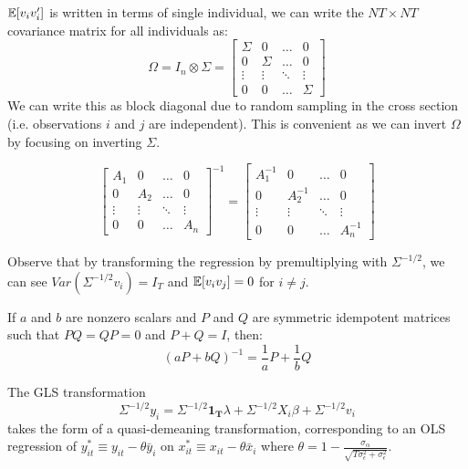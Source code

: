 \documentclass[DIV=14,titlepage=false]{scrreprt}
\begin{document}
$\mathbb{E}[v_{i}v_{i}']$ is written in terms of single individual, we can write the $NT \times NT$ covariance matrix for all individuals as:
\[
    \Omega = I_n \otimes \Sigma = \begin{bmatrix}
        \Sigma & 0 & \ldots & 0 \\
        0 & \Sigma & \ldots & 0 \\
        \vdots & \vdots & \ddots & \vdots \\
        0 & 0 & \ldots & \Sigma
    \end{bmatrix}
\]
We can write this as block diagonal due to random sampling in the cross section (i.e. observations $i$ and $j$ are independent). This is convenient as we can invert $\Omega$ by focusing on inverting $\Sigma$.
\begin{lemma}
    \[
        \begin{bmatrix}
            A_1 & 0 & \ldots & 0 \\
            0 & A_2 & \ldots & 0 \\
            \vdots & \vdots & \ddots & \vdots \\
            0 & 0 & \ldots & A_n
        \end{bmatrix}^{-1} = \begin{bmatrix}
            A_1^{-1} & 0 & \ldots & 0 \\
            0 & A_2^{-1} & \ldots & 0 \\
            \vdots & \vdots & \ddots & \vdots \\
            0 & 0 & \ldots & A_n^{-1}
        \end{bmatrix}
    \]
\end{lemma}
Observe that by transforming the regression by premultiplying with $\Sigma^{-1/2}$, we can see $Var(\Sigma^{-1/2}v_i) = I_T$ and $\mathbb{E}[v_i v_j] = 0$ for $i \neq j$.
\begin{lemma}
    If $a$ and $b$ are nonzero scalars and $P$ and $Q$ are symmetric idempotent matrices such that $PQ = QP = 0$ and $P + Q = I$, then:
    \[
        (aP + bQ)^{-1} = \frac{1}{a}P + \frac{1}{b}Q
    \]
\end{lemma}
\begin{theorem}
    The GLS transformation
    \[
        \Sigma^{-1/2}y_i = \Sigma^{-1/2}\mathbf{1_T}\lambda + \Sigma^{-1/2}X_i\beta + \Sigma^{-1/2}v_i
    \]
    takes the form of a quasi-demeaning transformation, corresponding to an OLS regression of $y^*_{it} \equiv y_{it} - \theta \bar{y}_i$ on $x^*_{it} \equiv x_{it} - \theta \bar{x}_i$ where $\theta = 1-\frac{\sigma_\alpha}{\sqrt{T \sigma^2_{\epsilon} + \sigma^2_{\epsilon}}}$.
\end{theorem}
\end{document}
